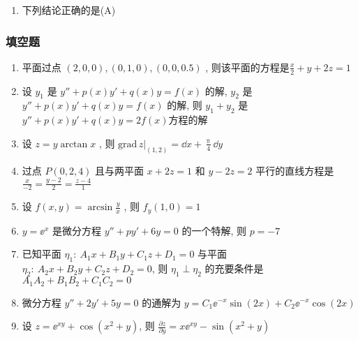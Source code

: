 \begin{enumerate}
	\item 下列结论正确的是(\hspace{0.25pc}A\hspace{0.25pc})
\end{enumerate}

\subsubsection{填空题}
\begin{enumerate}
	\item 平面过点 $(2,0,0),(0,1,0),(0,0,0.5)$ , 则该平面的方程是\underline{\hspace{1pc}$\frac{x}{2}+y+2z=1$\hspace{1pc}}
	\item 设 $y_1$ 是 $y''+p(x)y'+q(x)y=f(x)$ 的解, $y_2$ 是 $y''+p(x)y'+q(x)y=f(x)$ 的解, 则 $y_1+y_2$ 是\underline{\hspace{1pc}$y''+p(x)y'+q(x)y=2f(x)$\hspace{1pc}}方程的解
	\item 设 $z=y\arctan x$ , 则 $\left.\mathrm{grad}\,z\right|_{(1,2)}=$\underline{\hspace{1pc}$\dd x+\frac{\uppi}{4}\dd y$\hspace{1pc}}
	\item 过点 $P(0,2,4)$ 且与两平面 $x+2z=1$ 和 $y-2z=2$ 平行的直线方程是\underline{\hspace{1pc}$\frac{x}{-2}=\frac{y-2}{2}=\frac{z-4}{1}$\hspace{1pc}}
	\item 设 $f(x,y)=\arcsin\frac{y}{x}$ , 则 $f_y(1,0)=$\underline{\hspace{1pc}$1$\hspace{1pc}}
	\item $y=\ee^x$ 是微分方程 $y''+py'+6y=0$ 的一个特解, 则 $p=$\underline{\hspace{1pc}$-7$\hspace{1pc}}
	\item 已知平面 $\eta_1:\ A_1x+B_1y+C_1z+D_1=0$ 与平面 $\eta_2:\ A_2x+B_2y+C_2z+D_2=0$, 则 $\eta_1\perp\eta_2$ 的充要条件是\underline{\hspace{1pc}$A_1A_2+B_1B_2+C_1C_2=0$\hspace{1pc}}
	\item 微分方程 $y''+2y'+5y=0$ 的通解为 $y=$\underline{\hspace{1pc}$C_1\ee^{-x}\sin(2x)+C_2\ee^{-x}\cos(2x)$\hspace{1pc}}
	\item 设 $z=\ee^{xy}+\cos\left(x^2+y\right)$, 则 $\frac{\partial z}{\partial y}=$\underline{\hspace{1pc}$x\ee^{xy}-\sin\left(x^2+y\right)$\hspace{1pc}}
\end{enumerate}
